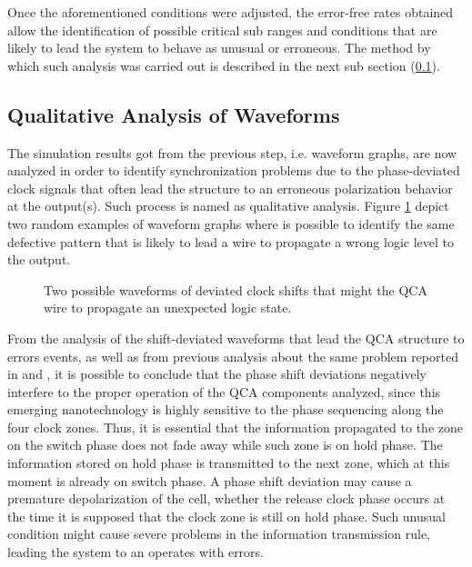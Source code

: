 Once the aforementioned conditions were adjusted, the error-free rates obtained allow the identification of possible critical sub ranges and conditions that are likely to lead the system to behave as unusual or erroneous. The method by which such analysis was carried out is described in the next sub section (\ref{subsection:Qualitative_Analysis_of_Waveforms}).

\subsection{Qualitative Analysis of Waveforms}
\label{subsection:Qualitative_Analysis_of_Waveforms}

The simulation results got from the previous step, i.e. waveform graphs, are now analyzed in order to identify synchronization problems due to the phase-deviated clock signals that often lead the structure to an erroneous polarization behavior at the output(s). Such process is named as qualitative analysis. Figure \ref{figure:Analysis_of_Waveforms} depict two random examples of waveform graphs where is possible to identify the same defective pattern that is likely to lead a wire to propagate a wrong logic level to the output.

\begin{figure}[!ht]
\center
{}
\hfill
{}
\caption{Two possible waveforms of deviated clock shifts that might the QCA wire to propagate an unexpected logic state.}
\label{figure:Analysis_of_Waveforms}
\end{figure}

From the analysis of the shift-deviated waveforms that lead the QCA structure to errors events, as well as from previous analysis about the same problem reported in \cite{ottavi07} and \cite{karim09}, it is possible to conclude that the phase shift deviations  negatively interfere to the proper operation of the QCA components analyzed, since this emerging nanotechnology is highly sensitive to the phase sequencing along the four clock zones. Thus, it is essential that the information propagated to the zone on the switch phase does not fade away while such zone is on hold phase. The information stored on hold phase is transmitted to the next zone, which at this moment is already on switch phase. A phase shift deviation may cause a premature depolarization of the cell, whether the release clock phase occurs at the time it is supposed that the clock zone is still on hold phase. Such unusual condition might cause severe problems in the information transmission rule, leading the system to an operates with errors.

